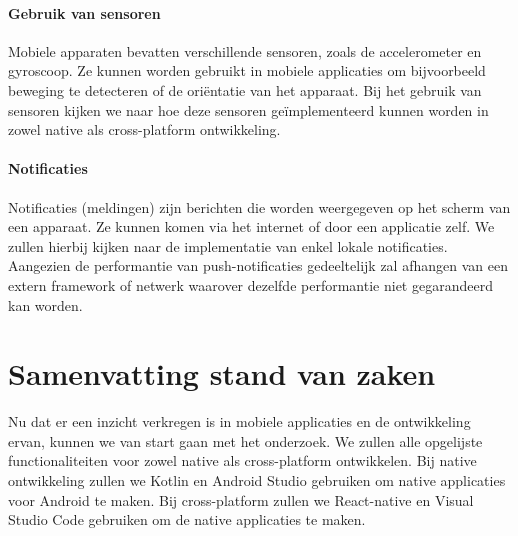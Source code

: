 \paragraph{Gebruik van sensoren}
Mobiele apparaten bevatten verschillende sensoren, zoals de accelerometer en gyroscoop. 
Ze kunnen worden gebruikt in mobiele applicaties om bijvoorbeeld beweging te detecteren 
of de oriëntatie van het apparaat. Bij het gebruik van sensoren kijken we naar hoe deze 
sensoren geïmplementeerd kunnen worden in zowel native als cross-platform ontwikkeling.

\paragraph{Notificaties}
Notificaties (meldingen) zijn berichten die worden weergegeven op het scherm van een 
apparaat. Ze kunnen komen via het internet of door een applicatie zelf. We zullen hierbij 
kijken naar de implementatie van enkel lokale notificaties. Aangezien de performantie van 
push-notificaties gedeeltelijk zal afhangen van een extern framework of netwerk waarover 
dezelfde performantie niet gegarandeerd kan worden.



\section{Samenvatting stand van zaken}
Nu dat er een inzicht verkregen is in mobiele applicaties en de ontwikkeling ervan, 
kunnen we van start gaan met het onderzoek. We zullen alle opgelijste functionaliteiten 
voor zowel native als cross-platform ontwikkelen. Bij native ontwikkeling zullen we 
Kotlin en Android Studio gebruiken om native applicaties voor Android te maken. 
Bij cross-platform zullen we React-native en Visual Studio Code gebruiken om de 
native applicaties te maken.














